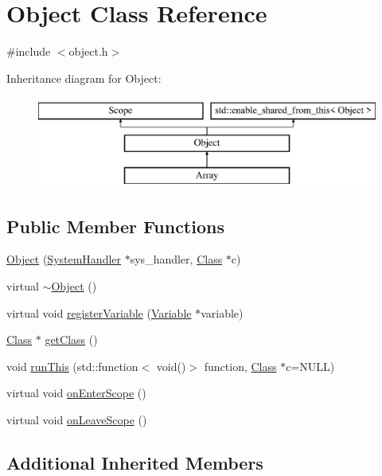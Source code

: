 \hypertarget{classObject}{}\section{Object Class Reference}
\label{classObject}


{\ttfamily \#include $<$object.\+h$>$}

Inheritance diagram for Object\+:\begin{figure}[H]
\begin{center}
\leavevmode
\includegraphics[height=3.000000cm]{classObject}
\end{center}
\end{figure}
\subsection*{Public Member Functions}
\begin{DoxyCompactItemize}
\item 
\hyperlink{classObject_a208aa5ccaeae34404f1ebacdfec66fbb}{Object} (\hyperlink{classSystemHandler}{System\+Handler} $\ast$sys\+\_\+handler, \hyperlink{classClass}{Class} $\ast$c)
\item 
virtual \hyperlink{classObject_aa3e791419d84c4c346ef9499513b8e00}{$\sim$\+Object} ()
\item 
virtual void \hyperlink{classObject_ad8f3631de109f50f94432ae9e1f7a130}{register\+Variable} (\hyperlink{classVariable}{Variable} $\ast$variable)
\item 
\hyperlink{classClass}{Class} $\ast$ \hyperlink{classObject_a51f229ad629a4ac1ad6e359a3b53941d}{get\+Class} ()
\item 
void \hyperlink{classObject_ae2bc4dcbc6eba10f4a93e0939477b7d5}{run\+This} (std\+::function$<$ void()$>$ function, \hyperlink{classClass}{Class} $\ast$c=N\+U\+LL)
\item 
virtual void \hyperlink{classObject_a61b4cd86dd434abf07e3f4d19b5c93eb}{on\+Enter\+Scope} ()
\item 
virtual void \hyperlink{classObject_a54a99563b5936626d47fb1e2f0e13a9c}{on\+Leave\+Scope} ()
\end{DoxyCompactItemize}
\subsection*{Additional Inherited Members}


